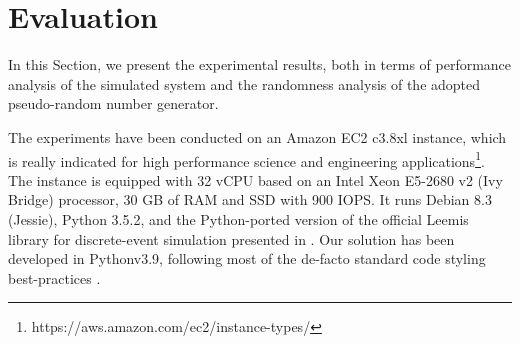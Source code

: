 \section{Evaluation}
\label{sec:evaluation}

In this Section, we present the experimental results, both in terms of performance analysis of the simulated system and the randomness analysis of the adopted pseudo-random number generator.

The experiments have been conducted on an Amazon EC2 c3.8xl instance, which is really indicated for high performance science and engineering applications\footnote{https://aws.amazon.com/ec2/instance-types/}.
The instance is equipped with 32 vCPU based on an Intel Xeon E5-2680 v2 (Ivy Bridge) processor, 30 GB of RAM and SSD with 900 IOPS.
It runs Debian 8.3 (Jessie), Python 3.5.2, and the Python-ported version of the official Leemis library for discrete-event simulation presented in \cite{leemis2006discrete}.
Our solution has been developed in Pythonv3.9, following most of the de-facto standard code styling best-practices \cite{reitz2016,GooglePythonStyleguide}.


